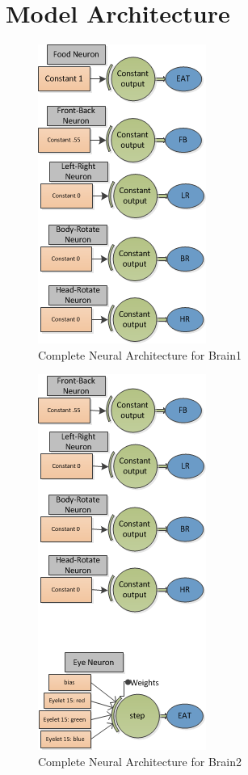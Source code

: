 \documentclass[a4paper,11pt]{article}
\begin{document}
\section{Model Architecture} \label{ap:arch}

\begin{figure}
\begin{center}
  \includegraphics[scale=1.0]{img/brain1complete.png}
  \caption{Complete Neural Architecture for Brain1 }
  \label{fig:brain1complete}
\end{center}
\end{figure}

\begin{figure}
\begin{center}
  \includegraphics[scale=1.0]{img/brain2complete.png}
  \caption{Complete Neural Architecture for Brain2 }
  \label{fig:brain2complete}
\end{center}
\end{figure}
\end{document}
